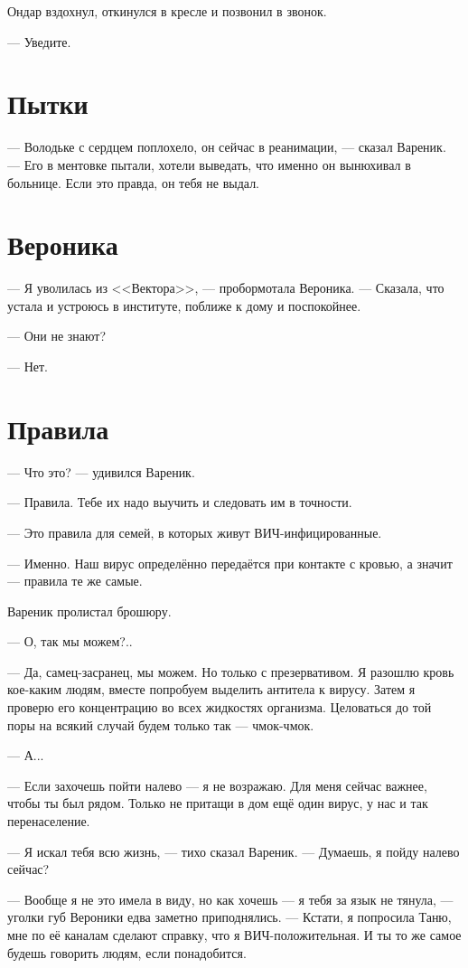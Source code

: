 \documentclass[a4paper,10pt,fleqn]{book}\usepackage{polyglossia}\setdefaultlanguage{english}\setotherlanguage{russian}\defaultfontfeatures{Ligatures=TeX,Mapping=tex-text} \usepackage{xcolor}\definecolor{lightgray}{HTML}{bbbbbb}\color{lightgray}\newcommand{\ml}[3]{\textcolor{black}{#3}}
\begin{document}
Ондар вздохнул, откинулся в кресле и позвонил в звонок.

--- Уведите.

\section{Пытки}

--- Володьке с сердцем поплохело, он сейчас в реанимации, --- сказал Вареник.
--- Его в ментовке пытали, хотели выведать, что именно он вынюхивал в больнице.
Если это правда, он тебя не выдал.

\section{Вероника}

--- Я уволилась из <<Вектора>>, --- пробормотала Вероника.
--- Сказала, что устала и устроюсь в институте, поближе к дому и поспокойнее.

--- Они не знают?

--- Нет.

\section{Правила}

--- Что это? --- удивился Вареник.

--- Правила.
Тебе их надо выучить и следовать им в точности.

--- Это правила для семей, в которых живут ВИЧ-инфицированные.

--- Именно.
Наш вирус определённо передаётся при контакте с кровью, а значит --- правила те же самые.

Вареник пролистал брошюру.

--- О, так мы можем?..

--- Да, самец-засранец, мы можем.
Но только с презервативом.
Я разошлю кровь кое-каким людям, вместе попробуем выделить антитела к вирусу.
Затем я проверю его концентрацию во всех жидкостях организма.
Целоваться до той поры на всякий случай будем только так --- чмок-чмок.

--- А...

--- Если захочешь пойти налево --- я не возражаю.
Для меня сейчас важнее, чтобы ты был рядом.
Только не притащи в дом ещё один вирус, у нас и так перенаселение.

--- Я искал тебя всю жизнь, --- тихо сказал Вареник.
--- Думаешь, я пойду налево сейчас?

--- Вообще я не это имела в виду, но как хочешь --- я тебя за язык не тянула, --- уголки губ Вероники едва заметно приподнялись.
--- Кстати, я попросила Таню, мне по её каналам сделают справку, что я ВИЧ-положительная.
И ты то же самое будешь говорить людям, если понадобится.
\end{document}
